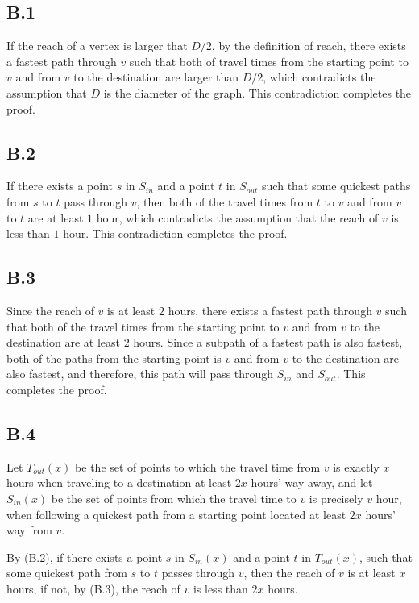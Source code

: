 \documentclass[titlepage,11pt,a4paper]{article}
\begin{document}
\subsection{B.1}
If the reach of a vertex is larger that $D/2$, by the definition of reach, there exists a fastest path through $v$ such that both of travel times from the starting point to $v$ and from $v$ to the destination are larger than $D/2$, which contradicts the assumption that $D$ is the diameter of the graph. This contradiction completes the proof.

\subsection{B.2}
If there exists a point $s$ in $S_{in}$ and a point $t$ in $S_{out}$ such that some quickest paths from $s$ to $t$ pass through $v$, then both of the travel times from $t$ to $v$ and from $v$ to $t$ are at least $1$ hour, which contradicts the assumption that the reach of $v$ is less than $1$ hour. This contradiction completes the proof.

\subsection{B.3}
Since the reach of $v$ is at least $2$ hours, there exists a fastest path through $v$ such that both of the travel times from the starting point to $v$ and from $v$ to the destination are at least $2$ hours. Since a subpath of a fastest path is also fastest, both of the paths from the starting point is $v$ and from $v$ to the destination are also fastest, and therefore, this path will pass through $S_{in}$ and $S_{out}$. This completes the proof.

\subsection{B.4}
Let $T_{out}(x)$ be the set of points to which the travel time from $v$ is exactly $x$ hours when traveling to a destination at least $2x$ hours' way away, and let $S_{in}(x)$ be the set of points from which the travel time to $v$ is precisely $v$ hour, when following a quickest path from a starting point located at least $2x$ hours' way from $v$.

By (B.2), if there exists a point $s$ in $S_{in}(x)$ and a point $t$ in $T_{out}(x)$, such that some quickest path from $s$ to $t$ passes through $v$, then the reach of $v$ is at least $x$ hours, if not, by (B.3), the reach of $v$ is less than $2x$ hours.
\end{document}
